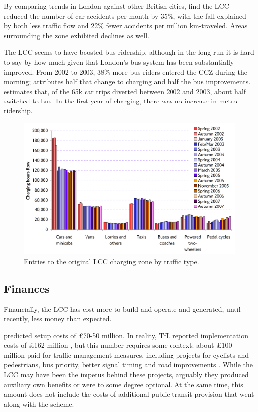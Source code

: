By comparing trends in London against other British cities, \citet{Green2016} find the LCC reduced the number of car accidents per month by 35\%, with the fall explained by both less traffic flow and 22\% fewer accidents per million km-traveled. Areas surrounding the zone exhibited declines as well.

The LCC seems to have boosted bus ridership, although in the long run it is hard to say by how much given that London's bus system has been substantially improved.  From 2002 to 2003, 38\% more bus riders entered the CCZ during the morning; \citet[pp. 40-41]{TfL2004a} attributes half that change to charging and half the bus improvements. \citet[p. 55]{TfL2004a} estimates that, of the 65k car trips diverted between 2002 and 2003, about half switched to bus. In the first year of charging, there was no increase in metro ridership. 

\begin{figure}[ht]
    \includegraphics[width=.95\textwidth]{../img/london-entries.png}
    \caption{Entries to the original LCC charging zone by traffic type. \citep[p. 20]{TfLFifth2007} } \label{fig:london-entries}
\end{figure}

\subsection{Finances}
Financially, the LCC has cost more to build and operate and generated, until recently, less money than expected.

\citet[p. 125]{ROCOL2000} predicted setup costs of \pounds30-50 million. In reality, TfL reported implementation costs of \pounds162 million \citep[p. 135]{TfLFifth2007}, but this number requires some context: about \pounds 100 million paid for traffic management measures, including projects for cyclists and pedestrians, bus priority, better signal timing and road improvements \citep[pp. 132-133,138]{Richards2006}. While the LCC may have been the impetus behind these projects, arguably they produced auxiliary own benefits or were to some degree optional. At the same time, this amount does not include the costs of additional public transit provision that went along with the scheme.

